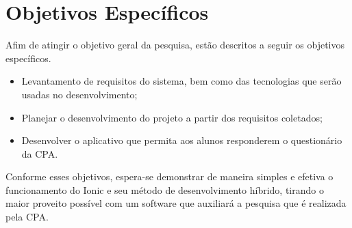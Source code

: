 \section{Objetivos Específicos}

	\par Afim de atingir o objetivo geral da pesquisa, estão descritos a seguir os objetivos específicos.
	
	\begin{itemize}
		\item Levantamento de requisitos do sistema, bem como das tecnologias que serão usadas no desenvolvimento;
		\item Planejar o desenvolvimento do projeto a partir dos requisitos coletados;
		\item Desenvolver o aplicativo que permita aos alunos responderem o questionário da CPA.
	\end{itemize}
	\par Conforme esses objetivos, espera-se demonstrar de maneira simples e efetiva o funcionamento do Ionic e seu método de desenvolvimento híbrido, tirando o maior proveito possível com um software que auxiliará a pesquisa que é realizada pela CPA.


